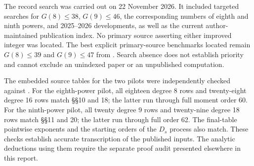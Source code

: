 \documentclass[11pt,letterpaper]{article}
\numberwithin{equation}{section}
\begin{document}
The record search was carried out on 22 November 2026. It included
targeted searches for $G(8)\le38$, $G(9)\le46$, the corresponding numbers
of eighth and ninth powers, and 2025--2026 developments, as well as the
current author-maintained publication index. No primary source asserting
either improved integer was located. The best explicit primary-source
benchmarks located remain $G(8)\le39$ and $G(9)\le47$ from \cite{W16}.
Search absence does not establish priority and cannot exclude an
unindexed paper or an unpublished computation.

The embedded source tables for the two pilots were independently checked
against \cite{VW00}. For the eighth-power pilot, all eighteen degree 8
rows and twenty-eight degree 16 rows match \S\S10 and 18; the latter run
through full moment order 60. For the ninth-power pilot, all twenty
degree 9 rows and twenty-nine degree 18 rows match \S\S11 and 20; the latter
run through full order 62. The final-table pointwise exponents and the
starting orders of the $D_s$ process also match. These checks establish
accurate transcription of the published inputs. The analytic deductions
using them require the separate proof audit presented elsewhere in this
report.

\par\bigskip{}

\end{document}
